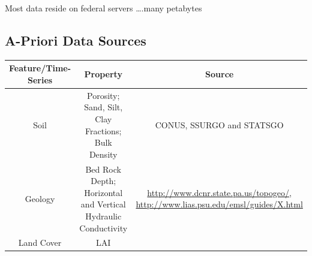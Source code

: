 \documentclass[]{scrbook}
\begin{document}
Most data reside on federal servers \ldots{}.many petabytes

\subsection{A-Priori Data Sources}\label{a-priori-data-sources}

\begin{longtable}[]{@{}ccc@{}}
\toprule
\begin{minipage}[b]{0.11\columnwidth}\centering\strut
Feature/Time-Series\strut
\end{minipage} & \begin{minipage}[b]{0.19\columnwidth}\centering\strut
Property\strut
\end{minipage} & \begin{minipage}[b]{0.42\columnwidth}\centering\strut
Source\strut
\end{minipage}\tabularnewline
\midrule
\endhead
\begin{minipage}[t]{0.11\columnwidth}\centering\strut
Soil\strut
\end{minipage} & \begin{minipage}[t]{0.19\columnwidth}\centering\strut
Porosity; Sand, Silt, Clay Fractions; Bulk Density\strut
\end{minipage} & \begin{minipage}[t]{0.42\columnwidth}\centering\strut
CONUS, SSURGO and STATSGO\strut
\end{minipage}\tabularnewline
\begin{minipage}[t]{0.11\columnwidth}\centering\strut
Geology\strut
\end{minipage} & \begin{minipage}[t]{0.19\columnwidth}\centering\strut
Bed Rock Depth; Horizontal and Vertical Hydraulic Conductivity\strut
\end{minipage} & \begin{minipage}[t]{0.42\columnwidth}\centering\strut
\url{http://www.dcnr.state.pa.us/topogeo/},
\url{http://www.lias.psu.edu/emsl/guides/X.html}\strut
\end{minipage}\tabularnewline
\begin{minipage}[t]{0.11\columnwidth}\centering\strut
Land Cover\strut
\end{minipage} & \begin{minipage}[t]{0.19\columnwidth}\centering\strut
LAI\strut
\end{minipage} & \begin{minipage}[t]{0.42\columnwidth}\centering\strut

\end{minipage}
\end{longtable}
\end{document}
